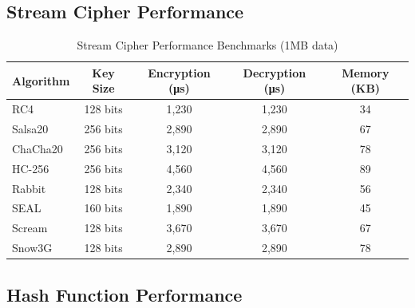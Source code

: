 \documentclass[12pt,a4paper]{article}
\begin{document}
\subsection{Stream Cipher Performance}

\begin{table}[h]
\centering
\caption{Stream Cipher Performance Benchmarks (1MB data)}
\begin{tabular}{|l|c|c|c|c|}
\hline
\textbf{Algorithm} & \textbf{Key Size} & \textbf{Encryption (μs)} & \textbf{Decryption (μs)} & \textbf{Memory (KB)} \\
\hline
RC4 & 128 bits & 1,230 & 1,230 & 34 \\
Salsa20 & 256 bits & 2,890 & 2,890 & 67 \\
ChaCha20 & 256 bits & 3,120 & 3,120 & 78 \\
HC-256 & 256 bits & 4,560 & 4,560 & 89 \\
Rabbit & 128 bits & 2,340 & 2,340 & 56 \\
SEAL & 160 bits & 1,890 & 1,890 & 45 \\
Scream & 128 bits & 3,670 & 3,670 & 67 \\
Snow3G & 128 bits & 2,890 & 2,890 & 78 \\
\hline
\end{tabular}
\end{table}

\subsection{Hash Function Performance}
\end{document}
